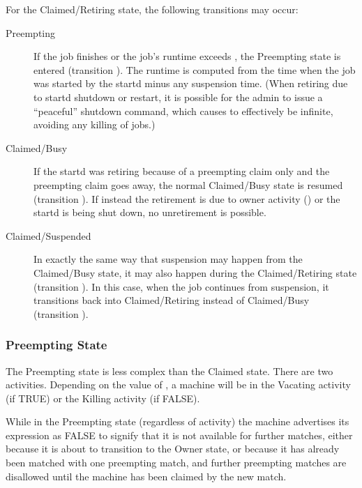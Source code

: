 For the Claimed/Retiring state, the following transitions may occur:

\begin{description}

\item[Preempting] If the job finishes or the job's runtime exceeds
, the Preempting state is entered
(transition ).  The runtime is computed from the time when the
job was started by the startd minus any suspension time.  (When retiring
due to startd shutdown or restart, it is possible for the admin to issue a
``peaceful'' shutdown command, which causes 
to effectively be infinite, avoiding any killing of jobs.)

\item[Claimed/Busy] If the startd was retiring because of a preempting
claim only and the preempting claim goes away, the normal Claimed/Busy
state is resumed (transition ).  If instead the retirement
is due to owner activity () or the startd is being shut down,
no unretirement is possible.

\item[Claimed/Suspended] In exactly the same way that suspension may
happen from the Claimed/Busy state, it may also happen during the
Claimed/Retiring state (transition ).  In this case, when the
job continues from suspension, it transitions back into
Claimed/Retiring instead of Claimed/Busy (transition ).

\end{description}

\subsubsection{\label{sec:Preempting-State}Preempting State}

The Preempting state is less complex than the Claimed state.
There are two activities.
Depending on the value of , a machine will
be in the
Vacating activity (if TRUE) or the Killing activity (if FALSE).  

While in the Preempting state (regardless of activity) the machine
advertises its  expression as FALSE to signify that
it is not available for further matches, either because it is about to
transition
to the Owner state, or because it has already been matched with
one preempting match, and further preempting matches are disallowed
until the machine has been claimed by the new match.

